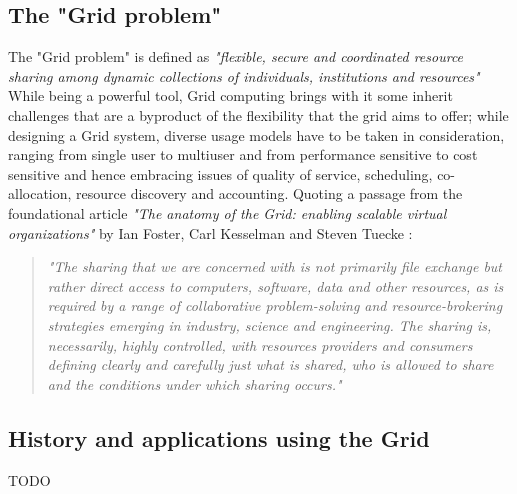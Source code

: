 \subsection{The "Grid problem"}
The "Grid problem" is defined as \textit{"flexible, secure and coordinated resource sharing among dynamic collections of individuals, institutions and resources"} \cite{the_anatomy_of_the_grid}
 While being a powerful tool, Grid computing brings with it some inherit challenges that are a byproduct of the flexibility that the grid aims to offer; while designing a Grid system, diverse usage models have to be taken in consideration, ranging from single user to multiuser and from performance sensitive to cost sensitive and hence embracing issues of quality of service, scheduling, co-allocation, resource discovery and accounting.
 Quoting a passage from the foundational article \textit{"The anatomy of the Grid: enabling scalable virtual organizations"} by Ian Foster, Carl Kesselman and Steven Tuecke \cite{the_anatomy_of_the_grid}:
\begin{quotation}
    \textit{"The sharing that we are concerned with is not primarily file exchange but rather direct access to computers, software, data and other resources, as is required by a range of collaborative problem-solving and resource-brokering strategies emerging in industry, science and engineering. The sharing is, necessarily, highly controlled, with resources providers and consumers defining clearly and carefully just what is shared, who is allowed to share and the conditions under which sharing occurs."}
\end{quotation}


\subsection{History and applications using the Grid}
TODO